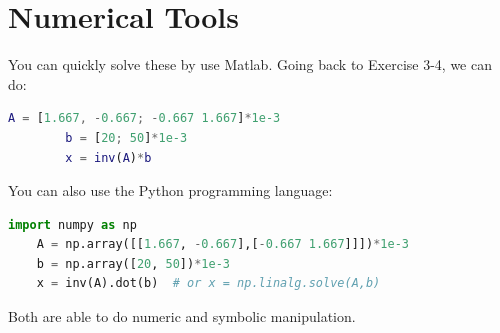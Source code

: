 \documentclass{handout}
\begin{document}
\newpage
\pagebreak
\clearpage

\section{Numerical Tools}

You can quickly solve these by use Matlab. Going back to Exercise 3-4, we can do:

	\begin{lstlisting}[language=Matlab,frame=single]
		A = [1.667, -0.667; -0.667 1.667]*1e-3
		b = [20; 50]*1e-3
		x = inv(A)*b
	\end{lstlisting}

You can also use the Python programming language:

\begin{lstlisting}[language=Python,frame=single]
	import numpy as np
	A = np.array([[1.667, -0.667],[-0.667 1.667]]])*1e-3
	b = np.array([20, 50])*1e-3
	x = inv(A).dot(b)  # or x = np.linalg.solve(A,b)
\end{lstlisting}

Both are able to do numeric and symbolic manipulation.

%
%


\end{document}
